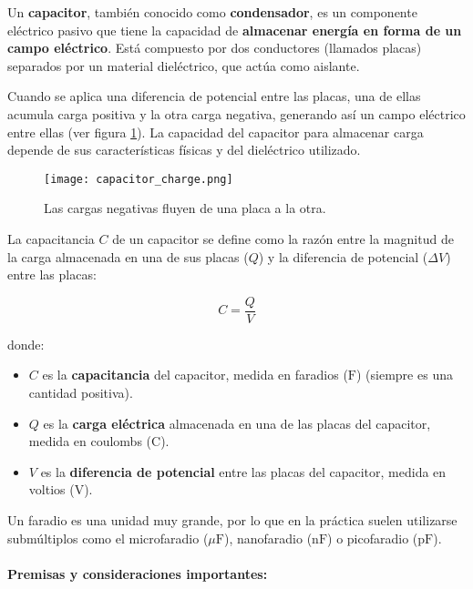 Un \textbf{capacitor}, también conocido como \textbf{condensador}, es un componente eléctrico pasivo que tiene la capacidad de \textbf{almacenar energía en forma de un campo eléctrico}. Está compuesto por dos conductores (llamados placas) separados por un material dieléctrico, que actúa como aislante.

Cuando se aplica una diferencia de potencial entre las placas, una de ellas acumula carga positiva y la otra carga negativa, generando así un campo eléctrico entre ellas (ver figura \ref{fig:capacitor_charge}). La capacidad del capacitor para almacenar carga depende de sus características físicas y del dieléctrico utilizado.

\begin{figure}[ht]
    \centering
    \texttt{[image: capacitor\_charge.png]}
    \caption{Las cargas negativas fluyen de una placa a la otra.}
    \label{fig:capacitor_charge}
\end{figure}

La capacitancia \( C \) de un capacitor se define como la razón entre la magnitud de la carga almacenada en una de sus placas (\( Q \)) y la diferencia de potencial (\( \Delta V \)) entre las placas:

\begin{equation}
    C = \frac{Q}{V}
    \label{eq:capacitance}    
\end{equation}

donde:

\begin{itemize}
    \item \( C \) es la \textbf{capacitancia} del capacitor, medida en faradios (\(\si{\farad}\)) (siempre es una cantidad positiva).
    \item \( Q \) es la \textbf{carga eléctrica} almacenada en una de las placas del capacitor, medida en coulombs (\(\si{\coulomb}\)).
    \item \( V \) es la \textbf{diferencia de potencial} entre las placas del capacitor, medida en voltios (\(\si{\volt}\)).
\end{itemize}

Un faradio es una unidad muy grande, por lo que en la práctica suelen utilizarse submúltiplos como el microfaradio (\(\mu\si{\farad}\)), nanofaradio (n\(\si{\farad}\)) o picofaradio (p\(\si{\farad}\)).

\paragraph{Premisas y consideraciones importantes:}

